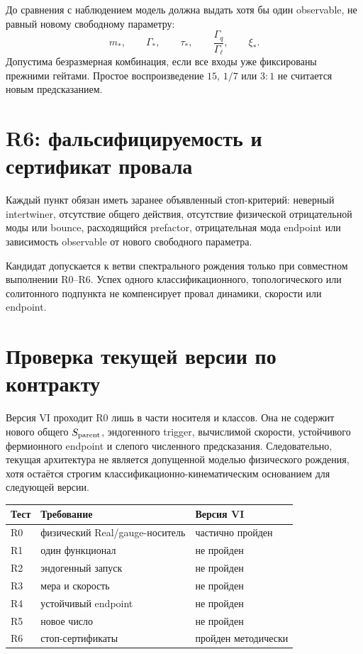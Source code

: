 До сравнения с наблюдением модель должна выдать хотя бы один observable,
не равный новому свободному параметру:
\begin{equation}
 m_*,\qquad \Gamma_*,\qquad \tau_*,\qquad
 \frac{\Gamma_q}{\Gamma_\ell},\qquad \xi_*.
\end{equation}
Допустима безразмерная комбинация, если все входы уже фиксированы прежними
гейтами. Простое воспроизведение $15$, $1/7$ или $3:1$ не считается новым
предсказанием.

\section{R6: фальсифицируемость и сертификат провала}

Каждый пункт обязан иметь заранее объявленный стоп-критерий:
неверный intertwiner, отсутствие общего действия, отсутствие физической
отрицательной моды или bounce, расходящийся prefactor, отрицательная мода
endpoint или зависимость observable от нового свободного параметра.

\begin{theorem}
Кандидат допускается к ветви спектрального рождения только при совместном
выполнении R0--R6. Успех одного классификационного, топологического или
солитонного подпункта не компенсирует провал динамики, скорости или
endpoint.
\end{theorem}

\section{Проверка текущей версии по контракту}

Версия VI проходит R0 лишь в части носителя и классов. Она не содержит
нового общего $S_{\rm parent}$, эндогенного trigger, вычислимой скорости,
устойчивого фермионного endpoint и слепого численного предсказания.
Следовательно, текущая архитектура не является допущенной моделью
физического рождения, хотя остаётся строгим классификационно-кинематическим
основанием для следующей версии.

\begin{center}
\begin{tabular}{p{}p{}p{}}
\toprule
Тест & Требование & Версия VI \\
\midrule
R0 & физический Real/gauge-носитель & частично пройден \\
R1 & один функционал & не пройден \\
R2 & эндогенный запуск & не пройден \\
R3 & мера и скорость & не пройден \\
R4 & устойчивый endpoint & не пройден \\
R5 & новое число & не пройден \\
R6 & стоп-сертификаты & пройден методически \\
\bottomrule
\end{tabular}
\end{center}


